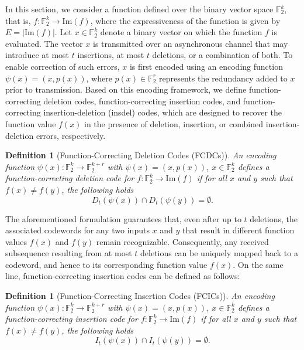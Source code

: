 \documentclass[11 pt]{article}
\numberwithin{equation}{section}
\newtheorem{definition}[theorem]{Definition}
\begin{document}
    In this section, we consider a function defined over the binary vector space $\mathbb{F}_2^k$, that is, $f: \mathbb{F}_2^k \rightarrow \mathrm{Im}(f)$, where the expressiveness of the function is given by $E = |\mathrm{Im}(f)|$. Let $x \in \mathbb{F}_2^k$ denote a binary vector on which the function $f$ is evaluated. The vector $x$ is transmitted over an asynchronous channel that may introduce at most $t$ insertions, at most $t$ deletions, or a combination of both. To enable correction of such errors, $x$ is first encoded using an encoding function $\psi(x) = (x, p(x))$, where $p(x) \in \mathbb{F}_2^r$ represents the redundancy added to $x$ prior to transmission. Based on this encoding framework, we define function-correcting deletion codes, function-correcting insertion codes, and function-correcting insertion-deletion (insdel) codes, which are designed to recover the function value $f(x)$ in the presence of deletion, insertion, or combined insertion-deletion errors, respectively.

    \begin{definition}[Function-Correcting Deletion Codes (FCDCs)]
        An encoding function $\psi(x): \mathbb{F}_2^k \rightarrow \mathbb{F}_2^{k+r}$ with $\psi(x) = (x, p(x))$, $x \in \mathbb{F}_2^k$ defines a function-correcting deletion code for $f: \mathbb{F}_2^k \rightarrow \mathrm{Im}(f)$ if for all $x$ and $y$ such that $f(x) \neq f(y)$, the following holds
        \[
           D_t(\psi(x)) \cap D_t(\psi(y)) = \emptyset.
        \]
    \end{definition}
    
    The aforementioned formulation guarantees that, even after up to $t$ deletions, the associated codewords for any two inputs $x$ and $y$ that result in different function values $f(x)$ and $f(y)$ remain recognizable. Consequently, any received subsequence resulting from at most $t$ deletions can be uniquely mapped back to a codeword, and hence to its corresponding function value $f(x)$.
    On the same line, function-correcting insertion codes can be defined as follows:
    
    \begin{definition}[Function-Correcting Insertion Codes (FCICs)]
        An encoding function $\psi(x): \mathbb{F}_2^k \rightarrow \mathbb{F}_2^{k+r}$ with $\psi(x) = (x, p(x))$, $x \in \mathbb{F}_2^k$ defines a function-correcting insertion code for $f: \mathbb{F}_2^k \rightarrow \mathrm{Im}(f)$ if for all $x$ and $y$ such that $f(x) \neq f(y)$, the following holds
        \[
           I_t(\psi(x)) \cap I_t(\psi(y)) = \emptyset.
        \]
    \end{definition}
    
\end{document}
